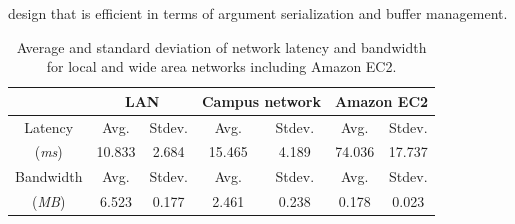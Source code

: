 \documentclass[10pt, conference, compsocconf]{IEEEtran}
\begin{document}
design that is efficient in terms of argument serialization and buffer
management.
%
\begin{table}
\centering
\caption{Average and standard deviation of network latency and bandwidth
for local and wide area networks including Amazon EC2.}
	\begin{tabular}{c|cc|cc|cc}
	\hline\hline
	\ & \multicolumn{2}{c|}{LAN} & \multicolumn{2}{c|}{Campus network} &
\multicolumn{2}{c}{Amazon EC2} \\
	\hline\hline
	Latency & Avg. & Stdev. & Avg. & Stdev. & Avg. & Stdev.\\
	(\textit{ms}) & 10.833 & 2.684 & 15.465 & 4.189 & 74.036 & 17.737 \\
	\hline 
	Bandwidth & Avg. & Stdev. & Avg. & Stdev. & Avg. & Stdev. \\
    (\textit{MB}) & 6.523 & 0.177 & 2.461 & 0.238 & 0.178 & 0.023 \\ \hline
	\end{tabular}
\end{table}
%
\end{document}
